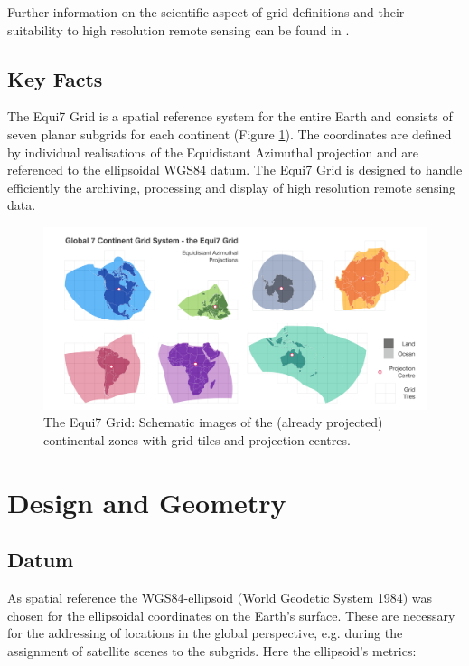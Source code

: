 \documentclass[11pt,a4paper]{article}
\begin{document}
Further information on the scientific aspect of grid definitions and their suitability to high resolution remote sensing can be found in \cite{Bauer-Marschallinger2014}.

\subsection{Key Facts}
The Equi7 Grid is a spatial reference system for the entire Earth and consists of seven planar subgrids for each continent (Figure \ref{fig:7cont}). The coordinates are defined by individual realisations of the Equidistant Azimuthal projection and are referenced to the ellipsoidal WGS84 datum. The Equi7 Grid is designed to handle efficiently the archiving, processing and display of high resolution remote sensing data.

\begin{figure}[hbtp]
\centering
\includegraphics[width=1.0\textwidth]{7continents_grid_v11}
\caption{
The Equi7 Grid: Schematic images of the (already projected) continental zones with grid tiles and projection centres.
}
\label{fig:7cont}
\end{figure}

\section{Design and Geometry}
\label{sec:design}

\subsection{Datum}
As spatial reference the WGS84-ellipsoid (World Geodetic System 1984) was chosen for the ellipsoidal coordinates on the Earth's surface. These are necessary for the addressing of locations in the global perspective, e.g. during the assignment of satellite scenes to the subgrids. Here the ellipsoid's metrics:
\end{document}
